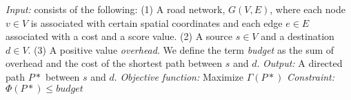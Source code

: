 \textit{Input: }consists of the following:\newline
(1) A road network, $G(V, E)$, where each node $v \in V$ is associated with certain spatial coordinates and each edge $e \in E$ associated with a cost and a score value.\newline
(2) A source $s \in V$ and a destination $d \in V$.\newline
(3) A positive value \textit{overhead}. We define the term \textit{budget} as the sum of overhead and the cost of the shortest path between $s$ and $d$.\newline
\textit{Output: }A directed path $P\ast$ between $s$ and $d$.\newline
\textit{Objective function: }Maximize $\Gamma(P\ast)$\newline
\textit{Constraint: }$\Phi(P\ast) \leq budget$